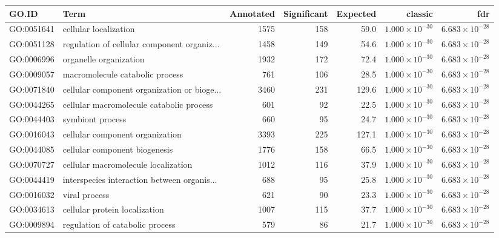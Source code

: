\begin{table}[ht]
\centering
\begin{adjustbox}{max width=\textwidth}
\begin{tabular}{llrrrrr}
  \hline
GO.ID & Term & Annotated & Significant & Expected & classic & fdr \\ 
  \hline
GO:0051641 & cellular localization & 1575 & 158 & 59.0 & $1.000 \times 10^{-30}$ & $6.683 \times 10^{-28}$ \\ 
  GO:0051128 & regulation of cellular component organiz... & 1458 & 149 & 54.6 & $1.000 \times 10^{-30}$ & $6.683 \times 10^{-28}$ \\ 
  GO:0006996 & organelle organization & 1932 & 172 & 72.4 & $1.000 \times 10^{-30}$ & $6.683 \times 10^{-28}$ \\ 
  GO:0009057 & macromolecule catabolic process & 761 & 106 & 28.5 & $1.000 \times 10^{-30}$ & $6.683 \times 10^{-28}$ \\ 
  GO:0071840 & cellular component organization or bioge... & 3460 & 231 & 129.6 & $1.000 \times 10^{-30}$ & $6.683 \times 10^{-28}$ \\ 
  GO:0044265 & cellular macromolecule catabolic process & 601 & 92 & 22.5 & $1.000 \times 10^{-30}$ & $6.683 \times 10^{-28}$ \\ 
  GO:0044403 & symbiont process & 660 & 95 & 24.7 & $1.000 \times 10^{-30}$ & $6.683 \times 10^{-28}$ \\ 
  GO:0016043 & cellular component organization & 3393 & 225 & 127.1 & $1.000 \times 10^{-30}$ & $6.683 \times 10^{-28}$ \\ 
  GO:0044085 & cellular component biogenesis & 1776 & 158 & 66.5 & $1.000 \times 10^{-30}$ & $6.683 \times 10^{-28}$ \\ 
  GO:0070727 & cellular macromolecule localization & 1012 & 116 & 37.9 & $1.000 \times 10^{-30}$ & $6.683 \times 10^{-28}$ \\ 
  GO:0044419 & interspecies interaction between organis... & 688 & 95 & 25.8 & $1.000 \times 10^{-30}$ & $6.683 \times 10^{-28}$ \\ 
  GO:0016032 & viral process & 621 & 90 & 23.3 & $1.000 \times 10^{-30}$ & $6.683 \times 10^{-28}$ \\ 
  GO:0034613 & cellular protein localization & 1007 & 115 & 37.7 & $1.000 \times 10^{-30}$ & $6.683 \times 10^{-28}$ \\ 
  GO:0009894 & regulation of catabolic process & 579 & 86 & 21.7 & $1.000 \times 10^{-30}$ & $6.683 \times 10^{-28}$ \\ 

\end{tabular}
\end{adjustbox}
\end{table}
